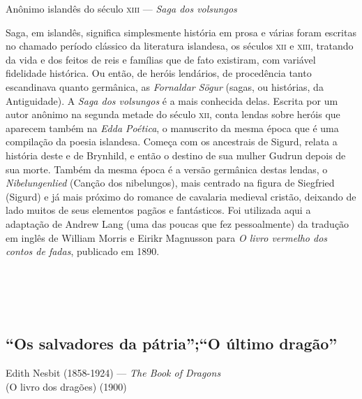 {\centering
Anônimo islandês do século \textsc{xiii} --- \textit{Saga dos volsungos}
\par\smallskip}

Saga, em islandês, significa simplesmente história em prosa e várias
foram escritas no chamado período clássico da literatura islandesa,
os séculos \textsc{xii} e \textsc{xiii}, tratando da vida e dos feitos de reis e
famílias que de fato existiram, com variável fidelidade histórica. Ou
então, de heróis lendários, de procedência tanto escandinava quanto
germânica, as \textit{Fornaldar Sögur} (sagas, ou histórias, da Antiguidade). A
\textit{Saga dos volsungos} é a mais conhecida
delas. Escrita por um autor anônimo na segunda metade do século \textsc{xii},
conta lendas sobre heróis que aparecem também na \textit{Edda
Poética}, o manuscrito da mesma época que é uma compilação da \mbox{poesia}
islandesa. Começa com os ancestrais de Sigurd, relata a
história deste e de Brynhild, e então o destino de sua mulher Gudrun
depois de sua morte. Também da mesma época é a versão germânica
destas lendas, o \textit{Nibelungenlied} (Canção dos nibelungos), mais centrado na figura de Siegfried
(Sigurd) e já mais próximo do romance de cavalaria medieval cristão,
deixando de lado muitos de seus elementos pagãos e fantásticos. Foi
utilizada aqui a adaptação de Andrew Lang (uma das poucas que fez
pessoalmente) da tradução em inglês de William
Morris e Eirikr Magnusson para \textit{O livro vermelho dos 
contos de fadas}, publicado em 1890.

\chapter*{\ }

\section[“Os salvadores da pátria”; “O último dragão”]{“Os salvadores da pátria”;\break “O último dragão”} 

{\centering
Edith Nesbit (1858-1924) --- \textit{The Book of Dragons}\\ (O livro dos dragões) (1900)
\par\smallskip}

